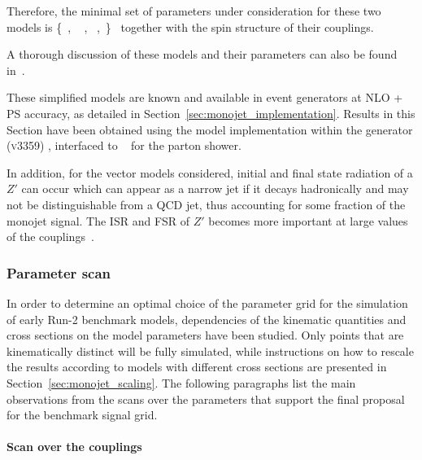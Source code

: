 Therefore, the minimal set of parameters under consideration for these two models is
\bea
\left\{~\gq, ~ \gDM, ~\mDM,~\mMed\right\} \,
\eea
together with the spin structure of their couplings. 

A thorough discussion of these models and their parameters can also be found in~\cite{Buchmueller:2014yoa}.
 
These simplified models are known and available in event generators at NLO + PS accuracy, as detailed in Section~\ref{sec:monojet_implementation}. 
Results in this Section have been obtained using the model implementation within the \powheg generator (\textsc{v3359}) \cite{Haisch:2013ata},  interfaced to \pythiaEight~\cite{Sjostrand:2007gs} for the parton shower.

In addition, for the vector models considered, initial and final state radiation of a $Z'$ can occur which can appear as a narrow jet if it decays hadronically and may not be distinguishable from a QCD jet, thus accounting for some fraction of the monojet signal. The ISR and FSR of $Z'$ becomes more important at large values of the couplings~\cite{Bai:2015nfa}. 

\subsubsection{Parameter scan}
\label{sub:parameter_scan_monojet}

In order to determine an optimal choice of the parameter grid for the simulation of early Run-2 benchmark models, dependencies of the kinematic quantities and cross sections on the model parameters have been studied. Only points that are kinematically distinct will be fully simulated, while instructions on how to rescale the results according to models with different cross sections are presented in Section~\ref{sec:monojet_scaling}. The following paragraphs list the main observations from the scans over the parameters that support the final proposal for the benchmark signal grid.

\paragraph{Scan over the couplings}

